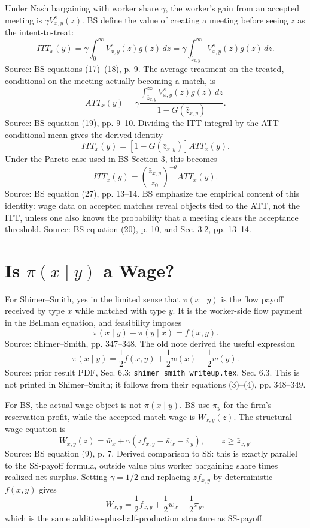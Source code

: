 \documentclass[11pt]{article}
\begin{document}
Under Nash bargaining with worker share $\gamma$, the worker's gain from an
accepted meeting is $\gamma V^s_{x,y}(z)$. BS define the value of creating a
meeting before seeing $z$ as the intent-to-treat:
\[
ITT_x(y)
=
\gamma\int_0^\infty V^s_{x,y}(z)g(z)\,dz
=
\gamma\int_{\bar z_{x,y}}^\infty V^s_{x,y}(z)g(z)\,dz.
\]
Source: BS equations (17)--(18), p. 9. The average treatment on the treated,
conditional on the meeting actually becoming a match, is
\[
ATT_x(y)
=
\gamma
\frac{\int_{\bar z_{x,y}}^\infty V^s_{x,y}(z)g(z)\,dz}
{1-G(\bar z_{x,y})}.
\]
Source: BS equation (19), pp. 9--10. Dividing the ITT integral by the ATT
conditional mean gives the derived identity
\[
ITT_x(y)=\left[1-G(\bar z_{x,y})\right]ATT_x(y).
\]
Under the Pareto case used in BS Section 3, this becomes
\[
ITT_x(y)
=
\left(\frac{\bar z_{x,y}}{z_0}\right)^{-\theta}ATT_x(y).
\]
Source: BS equation (27), pp. 13--14. BS emphasize the empirical content of this
identity: wage data on accepted matches reveal objects tied to the ATT, not the
ITT, unless one also knows the probability that a meeting clears the acceptance
threshold. Source: BS equation (20), p. 10, and Sec. 3.2, pp. 13--14.

\section{Is $\pi(x\mid y)$ a Wage?}

For Shimer--Smith, yes in the limited sense that $\pi(x\mid y)$ is the flow payoff
received by type $x$ while matched with type $y$. It is the worker-side flow
payment in the Bellman equation, and feasibility imposes
\[
\pi(x\mid y)+\pi(y\mid x)=f(x,y).
\]
Source: Shimer--Smith, pp. 347--348. The old note derived the useful expression
\[
\pi(x\mid y)
=
\frac12 f(x,y)+\frac12 w(x)-\frac12 w(y).
\tag{SS-payoff}
\]
Source: prior result PDF, Sec. 6.3; \texttt{shimer\_smith\_writeup.tex},
Sec. 6.3. This is not printed in Shimer--Smith; it follows from their equations
(3)--(4), pp. 348--349.

For BS, the actual wage object is not $\pi(x\mid y)$. BS use $\bar\pi_y$ for the
firm's reservation profit, while the accepted-match wage is $W_{x,y}(z)$. The
structural wage equation is
\[
W_{x,y}(z)
=
\bar w_x+\gamma\left(zf_{x,y}-\bar w_x-\bar\pi_y\right),
\qquad z\geq \bar z_{x,y}.
\]
Source: BS equation (9), p. 7. Derived comparison to SS: this is exactly parallel to the SS-payoff formula,
outside value plus worker bargaining share times realized net surplus. Setting
$\gamma=1/2$ and replacing $z f_{x,y}$ by deterministic $f(x,y)$ gives
\[
W_{x,y}
=
\frac12 f_{x,y}+\frac12\bar w_x-\frac12\bar\pi_y,
\]
which is the same additive-plus-half-production structure as SS-payoff.
\end{document}
